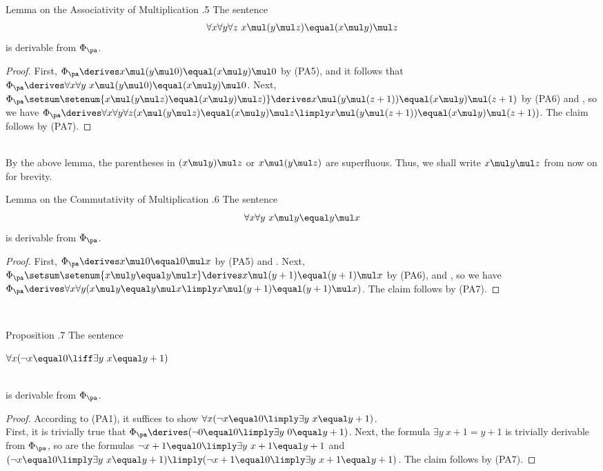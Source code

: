 \begin{theorem}{Lemma on the Associativity of Multiplication \thesection.5} The sentence
\[
\forall x \forall y \forall z \ x \mul (y \mul z) \equal (x \mul y) \mul z
\]
is derivable from $\Phi_\pa$.
\end{theorem}
\begin{proof}
First, $\Phi_\pa \derives x \mul (y \mul 0) \equal (x \mul y) \mul 0$ by (PA5), and it follows that $\Phi_\pa \derives \forall x \forall y \ x \mul (y \mul 0) \equal (x \mul y) \mul 0$. Next, $\Phi_\pa \setsum \setenum{x \mul (y \mul z) \equal (x \mul y) \mul z)} \derives x \mul (y \mul (z + 1)) \equal (x \mul y) \mul (z + 1)$ by (PA6) and , so we have $\Phi_\pa \derives \forall x \forall y \forall z (x \mul (y \mul z) \equal (x \mul y) \mul z \limply x \mul (y \mul (z + 1)) \equal (x \mul y) \mul (z + 1))$. The claim follows by (PA7).
\end{proof}\ \medskip\\
By the above lemma, the parentheses in $(x \mul y) \mul z$ or $x \mul (y \mul z)$ are superfluous. Thus, we shall write $x \mul y \mul z$ from now on for brevity.\bigskip\\
\begin{theorem}{Lemma on the Commutativity of Multiplication \thesection.6} The sentence
\[
\forall x \forall y \ x \mul y \equal y \mul x
\]
is derivable from $\Phi_\pa$.
\end{theorem}
\begin{proof}
First, $\Phi_\pa \derives x \mul 0 \equal 0 \mul x$ by (PA5) and . Next, $\Phi_\pa \setsum \setenum{x \mul y \equal y \mul x} \derives x \mul (y + 1) \equal (y + 1) \mul x$ by (PA6),  and , so we have $\Phi_\pa \derives \forall x \forall y (x \mul y \equal y \mul x \limply x \mul (y + 1) \equal (y + 1) \mul x)$. The claim follows by (PA7).
\end{proof}\ \medskip\\
\begin{theorem}{Proposition \thesection.7}
The sentence\\
\centerline{$\forall x (\neg x \equal 0 \liff \exists y \ x \equal y + 1)$}\\
is derivable from $\Phi_\pa$.
\end{theorem}
\begin{proof}
According to (PA1), it suffices to show $\forall x (\neg x \equal 0 \limply \exists y \ x \equal y + 1)$.\medskip\\
First, it is trivially true that $\Phi_\pa \derives (\neg 0 \equal 0 \limply \exists y \ 0 \equal y + 1)$. Next, the formula $\exists y \ x + 1 \equal y + 1$ is trivially derivable from $\Phi_\pa$, so are the formulas $\neg x + 1 \equal 0 \limply \exists y \ x + 1 \equal y + 1$ and $(\neg x \equal 0 \limply \exists y \ x \equal y + 1) \limply (\neg x + 1 \equal 0 \limply \exists y \ x + 1 \equal y + 1)$. The claim follows by (PA7).
\end{proof}\ \medskip\\

